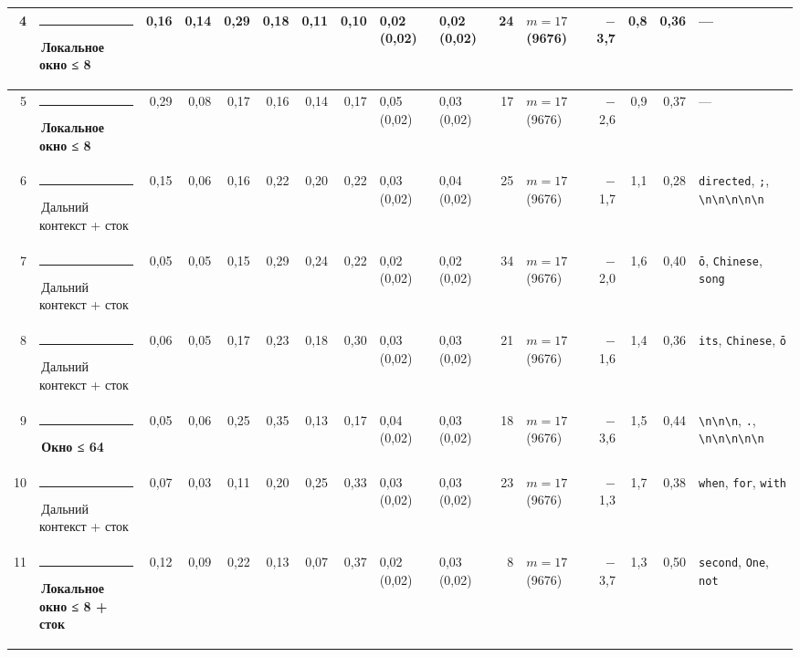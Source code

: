 \documentclass[10pt]{article}
\begin{document}
\begin{minipage}{\linewidth}
\begin{center}
{\begin{tabular}{|r|l|r|r|r|r|r|r|l|l|r|l|r|r|r|l|}
4 & \textcolor[HTML]{1BAF7A}{\rule{0.62em}{0.62em}}\,\textbf{Локальное окно ≤ 8} & 0,16 & 0,14 & 0,29 & 0,18 & 0,11 & 0,10 & 0,02 (0,02) & 0,02 (0,02) & 24 & $m{=}17$ (9676) & $-$3,7 & 0,8 & 0,36 & — \\ \hline
5 & \textcolor[HTML]{1BAF7A}{\rule{0.62em}{0.62em}}\,\textbf{Локальное окно ≤ 8} & 0,29 & 0,08 & 0,17 & 0,16 & 0,14 & 0,17 & 0,05 (0,02) & 0,03 (0,02) & 17 & $m{=}17$ (9676) & $-$2,6 & 0,9 & 0,37 & — \\ \hline
6 & \textcolor[HTML]{C3C2B7}{\rule{0.62em}{0.62em}}\,Дальний контекст + сток & 0,15 & 0,06 & 0,16 & 0,22 & 0,20 & 0,22 & 0,03 (0,02) & 0,04 (0,02) & 25 & $m{=}17$ (9676) & $-$1,7 & 1,1 & 0,28 & \texttt{\textvisiblespace{}directed}, \texttt{\textvisiblespace{};}, \texttt{\textbackslash{}n\textbackslash{}n\textbackslash{}n\textbackslash{}n\textbackslash{}n} \\ \hline
7 & \textcolor[HTML]{C3C2B7}{\rule{0.62em}{0.62em}}\,Дальний контекст + сток & 0,05 & 0,05 & 0,15 & 0,29 & 0,24 & 0,22 & 0,02 (0,02) & 0,02 (0,02) & 34 & $m{=}17$ (9676) & $-$2,0 & 1,6 & 0,40 & \texttt{ō}, \texttt{\textvisiblespace{}Chinese}, \texttt{\textvisiblespace{}song} \\ \hline
8 & \textcolor[HTML]{C3C2B7}{\rule{0.62em}{0.62em}}\,Дальний контекст + сток & 0,06 & 0,05 & 0,17 & 0,23 & 0,18 & 0,30 & 0,03 (0,02) & 0,03 (0,02) & 21 & $m{=}17$ (9676) & $-$1,6 & 1,4 & 0,36 & \texttt{\textvisiblespace{}its}, \texttt{\textvisiblespace{}Chinese}, \texttt{ō} \\ \hline
9 & \textcolor[HTML]{EDA100}{\rule{0.62em}{0.62em}}\,\textbf{Окно ≤ 64} & 0,05 & 0,06 & 0,25 & 0,35 & 0,13 & 0,17 & 0,04 (0,02) & 0,03 (0,02) & 18 & $m{=}17$ (9676) & $-$3,6 & 1,5 & 0,44 & \texttt{\textvisiblespace{}\textbackslash{}n\textbackslash{}n\textbackslash{}n}, \texttt{\textvisiblespace{}.}, \texttt{\textbackslash{}n\textbackslash{}n\textbackslash{}n\textbackslash{}n\textbackslash{}n} \\ \hline
10 & \textcolor[HTML]{C3C2B7}{\rule{0.62em}{0.62em}}\,Дальний контекст + сток & 0,07 & 0,03 & 0,11 & 0,20 & 0,25 & 0,33 & 0,03 (0,02) & 0,03 (0,02) & 23 & $m{=}17$ (9676) & $-$1,3 & 1,7 & 0,38 & \texttt{\textvisiblespace{}when}, \texttt{\textvisiblespace{}for}, \texttt{\textvisiblespace{}with} \\ \hline
11 & \textcolor[HTML]{1BAF7A}{\rule{0.62em}{0.62em}}\,\textbf{Локальное окно ≤ 8 + сток} & 0,12 & 0,09 & 0,22 & 0,13 & 0,07 & 0,37 & 0,02 (0,02) & 0,03 (0,02) & 8 & $m{=}17$ (9676) & $-$3,7 & 1,3 & 0,50 & \texttt{\textvisiblespace{}second}, \texttt{\textvisiblespace{}One}, \texttt{\textvisiblespace{}not} \\ \hline

\end{tabular}}
\end{center}
\end{minipage}
\end{document}
